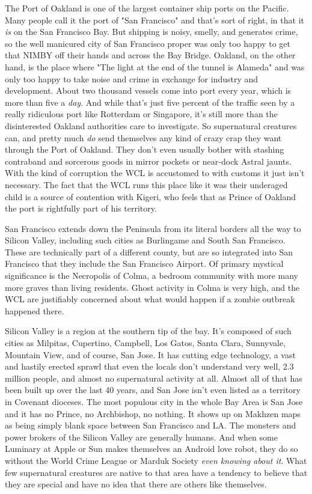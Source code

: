 The Port of Oakland is one of the largest container ship ports on the Pacific. Many people call it the port of "San Francisco" and that's sort of right, in that it \textit{is} on the San Francisco Bay. But shipping is noisy, smelly, and generates crime, so the well manicured city of San Francisco proper was only too happy to get that NIMBY off their hands and across the Bay Bridge. Oakland, on the other hand, is the place where "The light at the end of the tunnel is Alameda" and was only too happy to take noise and crime in exchange for industry and development. About two thousand vessels come into port every year, which is more than five a \textit{day}. And while that's just five percent of the traffic seen by a really ridiculous port like Rotterdam or Singapore, it's still more than the disinterested Oakland authorities care to investigate. So supernatural creatures can, and pretty much \textit{do} send themselves any kind of crazy crap they want through the Port of Oakland. They don't even usually bother with stashing contraband and sorcerous goods in mirror pockets or near-dock Astral jaunts. With the kind of corruption the WCL is accustomed to with customs it just isn't necessary. The fact that the WCL runs this place like it was their underaged child is a source of contention with Kigeri, who feels that as Prince of Oakland the port is rightfully part of his territory. 

San Francisco extends down the Peninsula from its literal borders all the way to Silicon Valley, including such cities as Burlingame and South San Francisco. These are technically part of a different county, but are so integrated into San Francisco that they include the San Francisco Airport. Of primary mystical significance is the Necropolis of Colma, a bedroom community with more many more graves than living residents. Ghost activity in Colma is very high, and the WCL are justifiably concerned about what would happen if a zombie outbreak happened there.

Silicon Valley is a region at the southern tip of the bay. It's composed of such cities as Milpitas, Cupertino, Campbell, Los Gatos, Santa Clara, Sunnyvale, Mountain View, and of course, San Jose. It has cutting edge technology, a vast and hastily erected sprawl that even the locals don't understand very well, 2.3 million people, and almost no supernatural activity at all. Almost all of that has been built up over the last 40 years, and San Jose isn't even listed as a territory in Covenant dioceses. The most populous city in the whole Bay Area is San Jose and it has no Prince, no Archbishop, no nothing. It shows up on Makhzen maps as being simply blank space between San Francisco and LA. The monsters and power brokers of the Silicon Valley are generally humans. And when some Luminary at Apple or Sun makes themselves an Android love robot, they do so without the World Crime League or Marduk Society \textit{even knowing about it}. What few supernatural creatures are native to that area have a tendency to believe that they are special and have no idea that there are others like themselves.

